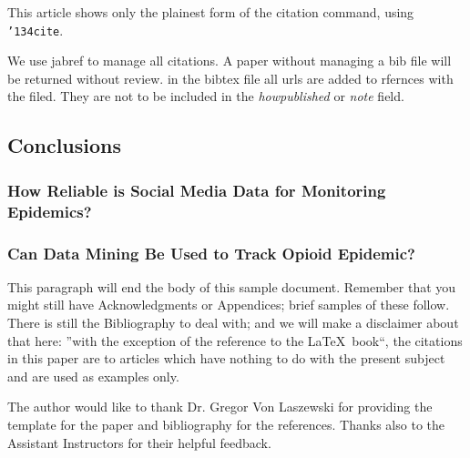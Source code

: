 \documentclass[sigconf]{acmart}
\begin{document}
This article shows only the plainest form of the citation command,
using \texttt{{\char'134}cite}.

We use jabref to manage all citations. A paper without managing a bib
file will be returned without review. in the bibtex file all urls are
added to rfernces with the  filed. They are not to be
included in the {\it howpublished} or {\it note} field. 


\subsection{Conclusions}


\subsubsection{How Reliable is Social Media Data for Monitoring Epidemics?}


\subsubsection{Can Data Mining Be Used to Track Opioid Epidemic?}


This paragraph will end the body of this sample document.  Remember
that you might still have Acknowledgments or Appendices; brief samples
of these follow.  There is still the Bibliography to deal with; and we
will make a disclaimer about that here: ''with the exception of the
reference to the \LaTeX\ book``, the citations in this paper are to
articles which have nothing to do with the present subject and are
used as examples only.


\begin{acks}

  The author would like to thank Dr. Gregor Von Laszewski for providing the 
  \LaTex template for the paper and \JabRef bibliography for the references. 
  Thanks also to the Assistant Instructors for their helpful feedback.

\end{acks}


 
\end{document}
